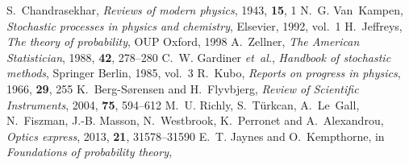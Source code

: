 \documentclass[english,aps, twocolumn, pre,superscriptaddress]{revtex4-1}
\begin{document}
\begin{mcitethebibliography}{17}
S.~Chandrasekhar, \emph{Reviews of modern physics}, 1943, \textbf{15}, 1\relax
\mciteBstWouldAddEndPuncttrue
\mciteSetBstMidEndSepPunct{\mcitedefaultmidpunct}
{\mcitedefaultendpunct}{\mcitedefaultseppunct}\relax
\EndOfBibitem
{}
N.~G. Van~Kampen, \emph{Stochastic processes in physics and chemistry},
  Elsevier, 1992, vol.~1\relax
\mciteBstWouldAddEndPuncttrue
\mciteSetBstMidEndSepPunct{\mcitedefaultmidpunct}
{\mcitedefaultendpunct}{\mcitedefaultseppunct}\relax
\EndOfBibitem
{}
H.~Jeffreys, \emph{The theory of probability}, OUP Oxford, 1998\relax
\mciteBstWouldAddEndPuncttrue
\mciteSetBstMidEndSepPunct{\mcitedefaultmidpunct}
{\mcitedefaultendpunct}{\mcitedefaultseppunct}\relax
\EndOfBibitem
{}
A.~Zellner, \emph{The American Statistician}, 1988, \textbf{42}, 278--280\relax
\mciteBstWouldAddEndPuncttrue
\mciteSetBstMidEndSepPunct{\mcitedefaultmidpunct}
{\mcitedefaultendpunct}{\mcitedefaultseppunct}\relax
\EndOfBibitem
{}
C.~W. Gardiner \emph{et~al.}, \emph{Handbook of stochastic methods}, Springer
  Berlin, 1985, vol.~3\relax
\mciteBstWouldAddEndPuncttrue
\mciteSetBstMidEndSepPunct{\mcitedefaultmidpunct}
{\mcitedefaultendpunct}{\mcitedefaultseppunct}\relax
\EndOfBibitem
{}
R.~Kubo, \emph{Reports on progress in physics}, 1966, \textbf{29}, 255\relax
\mciteBstWouldAddEndPuncttrue
\mciteSetBstMidEndSepPunct{\mcitedefaultmidpunct}
{\mcitedefaultendpunct}{\mcitedefaultseppunct}\relax
\EndOfBibitem
{}
K.~Berg-S{\o}rensen and H.~Flyvbjerg, \emph{Review of Scientific Instruments},
  2004, \textbf{75}, 594--612\relax
\mciteBstWouldAddEndPuncttrue
\mciteSetBstMidEndSepPunct{\mcitedefaultmidpunct}
{\mcitedefaultendpunct}{\mcitedefaultseppunct}\relax
\EndOfBibitem
{}
M.~U. Richly, S.~T{\"u}rkcan, A.~Le~Gall, N.~Fiszman, J.-B. Masson,
  N.~Westbrook, K.~Perronet and A.~Alexandrou, \emph{Optics express}, 2013,
  \textbf{21}, 31578--31590\relax
\mciteBstWouldAddEndPuncttrue
\mciteSetBstMidEndSepPunct{\mcitedefaultmidpunct}
{\mcitedefaultendpunct}{\mcitedefaultseppunct}\relax
\EndOfBibitem
{}
E.~T. Jaynes and O.~Kempthorne, in \emph{Foundations of probability theory,
}
\end{mcitethebibliography}
\end{document}

